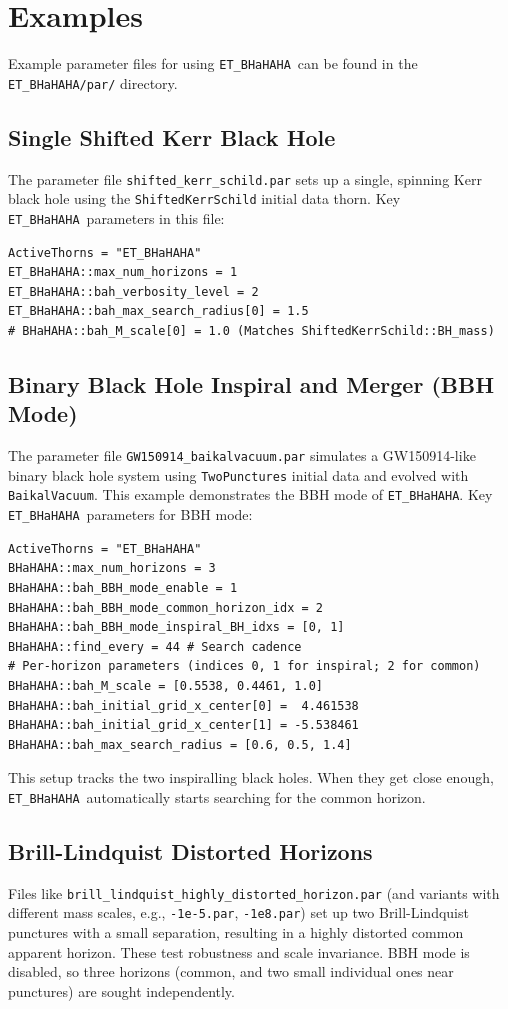 \documentclass[a4paper,11pt]{article}
\newcommand{\thorn}[1]{{\tt #1}}
\newcommand{\file}[1]{{\tt #1}}
\newcommand{\BHaHAHA}{\thorn{ET\_BHaHAHA}} %
\begin{document}
\section{Examples}
\label{sec:examples}
Example parameter files for using \BHaHAHA\ can be found in the \file{ET\_BHaHAHA/par/} directory.

\subsection{Single Shifted Kerr Black Hole}
The parameter file \file{shifted\_kerr\_schild.par} sets up a single, spinning Kerr black hole using the \thorn{ShiftedKerrSchild} initial data thorn.
Key \BHaHAHA\ parameters in this file:
\begin{verbatim}
ActiveThorns = "ET_BHaHAHA"
ET_BHaHAHA::max_num_horizons = 1
ET_BHaHAHA::bah_verbosity_level = 2
ET_BHaHAHA::bah_max_search_radius[0] = 1.5
# BHaHAHA::bah_M_scale[0] = 1.0 (Matches ShiftedKerrSchild::BH_mass)
\end{verbatim}

\subsection{Binary Black Hole Inspiral and Merger (BBH Mode)}
The parameter file \file{GW150914\_baikalvacuum.par} simulates a GW150914-like binary black hole system using \thorn{TwoPunctures} initial data and evolved with \thorn{BaikalVacuum}. This example demonstrates the BBH mode of \BHaHAHA.
Key \BHaHAHA\ parameters for BBH mode:
\begin{verbatim}
ActiveThorns = "ET_BHaHAHA"
BHaHAHA::max_num_horizons = 3
BHaHAHA::bah_BBH_mode_enable = 1
BHaHAHA::bah_BBH_mode_common_horizon_idx = 2
BHaHAHA::bah_BBH_mode_inspiral_BH_idxs = [0, 1]
BHaHAHA::find_every = 44 # Search cadence
# Per-horizon parameters (indices 0, 1 for inspiral; 2 for common)
BHaHAHA::bah_M_scale = [0.5538, 0.4461, 1.0]
BHaHAHA::bah_initial_grid_x_center[0] =  4.461538
BHaHAHA::bah_initial_grid_x_center[1] = -5.538461
BHaHAHA::bah_max_search_radius = [0.6, 0.5, 1.4]
\end{verbatim}
This setup tracks the two inspiralling black holes. When they get close enough, \BHaHAHA\ automatically starts searching for the common horizon.

\subsection{Brill-Lindquist Distorted Horizons}
Files like \file{brill\_lindquist\_highly\_distorted\_horizon.par} (and variants with different mass scales, e.g., \file{-1e-5.par}, \file{-1e8.par}) set up two Brill-Lindquist punctures with a small separation, resulting in a highly distorted common apparent horizon. These test robustness and scale invariance. BBH mode is disabled, so three horizons (common, and two small individual ones near punctures) are sought independently.
\end{document}
